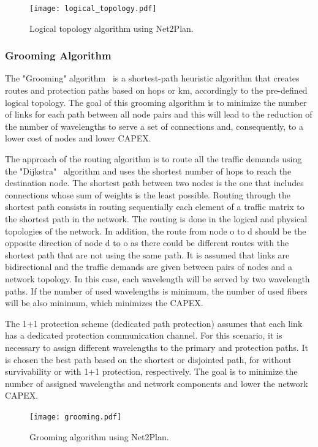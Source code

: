 \begin{figure}[h!]
\centering
\texttt{[image: logical\_topology.pdf]}
\caption{Logical topology algorithm using Net2Plan.}
\label{logical_topology}
\end{figure}

\subsubsection{Grooming Algorithm}\label{grooming_algorithm}

\vspace{11pt}
The "Grooming" algorithm \ is a shortest-path heuristic algorithm that creates routes and protection paths based on hops or km, accordingly to the pre-defined logical topology. The goal of this grooming algorithm is to minimize the number of links for each path between all node pairs and this will lead to the reduction of the number of wavelengths to serve a set of connections and, consequently, to a lower cost of nodes and lower CAPEX.

The approach of the routing algorithm is to route all the traffic demands using the "Dijkstra" \ algorithm and uses the shortest number of hops to reach the destination node. The shortest path between two nodes is the one that includes connections whose sum of weights is the least possible. Routing through the shortest path consists in routing sequentially each element of a traffic matrix to the shortest path in the network. The routing is done in the logical and physical topologies of the network. In addition, the route from node o to d should be the opposite direction of node d to o as there could be different routes with the shortest path that are not using the same path. It is assumed that links are bidirectional and the traffic demands are given between pairs of nodes and a network topology. In this case, each wavelength will be served by two wavelength paths. If the number of used wavelengths is minimum, the number of used fibers will be also minimum, which minimizes the CAPEX.

The 1+1 protection scheme (dedicated path protection) assumes that each link has a dedicated protection communication channel. For this scenario, it is necessary to assign different wavelengths to the primary and protection paths. It is chosen the best path based on the shortest or disjointed path, for without survivability or with 1+1 protection, respectively. The goal is to minimize the number of assigned wavelengths and network components and lower the network CAPEX.

\begin{figure}[H]
\centering
\texttt{[image: grooming.pdf]}
\caption{Grooming algorithm using Net2Plan.}
\label{grooming}
\end{figure}
